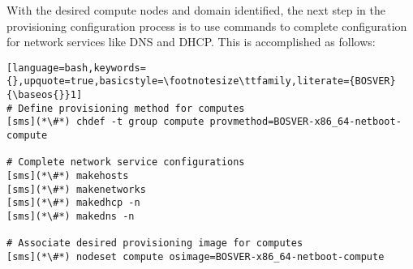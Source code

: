 With the desired compute nodes and domain identified, the next step in the
provisioning configuration process is to use \xCAT{} commands to complete
configuration for network services like DNS and DHCP. This is
accomplished as follows:

\begin{lstlisting}[language=bash,keywords={},upquote=true,basicstyle=\footnotesize\ttfamily,literate={BOSVER}{\baseos{}}1]
# Define provisioning method for computes
[sms](*\#*) chdef -t group compute provmethod=BOSVER-x86_64-netboot-compute

# Complete network service configurations
[sms](*\#*) makehosts
[sms](*\#*) makenetworks
[sms](*\#*) makedhcp -n
[sms](*\#*) makedns -n

# Associate desired provisioning image for computes
[sms](*\#*) nodeset compute osimage=BOSVER-x86_64-netboot-compute

\end{lstlisting}


